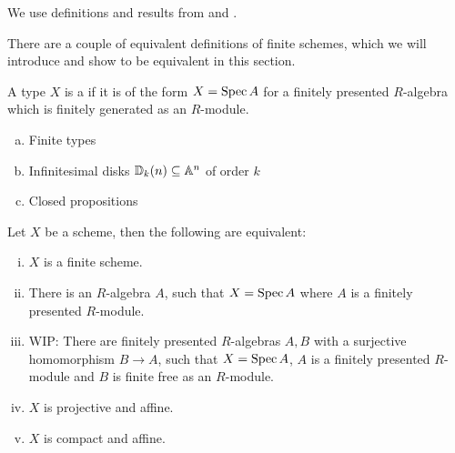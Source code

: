 We use definitions and results from \cite{draft} and \cite{proper-draft}.

There are a couple of equivalent definitions of finite schemes, which we will introduce and show to be equivalent in this section.

\begin{definition}
  A type $X$ is a  if it is of the form $X=\operatorname{Spec} A$ for a finitely presented $R$-algebra which is finitely generated as an $R$-module.
\end{definition}

\begin{example}
  \begin{enumerate}[(a)]
  \item Finite types
  \item Infinitesimal disks $\mathbb{D}_k(n)\subseteq\mathbb{A}^n$ of order $k$
  \item Closed propositions
  \end{enumerate}
\end{example}

\begin{theorem}
  \label{finite-scheme-characterization}
  Let $X$ be a scheme, then the following are equivalent:
  \begin{enumerate}[(i)]
  \item $X$ is a finite scheme.
  \item There is an $R$-algebra $A$, such that $X=\operatorname{Spec} A$ where $A$ is a finitely presented $R$-module.
  \item WIP: There are finitely presented $R$-algebras $A,B$ with a surjective homomorphism $B\to A$, such that $X=\operatorname{Spec} A$, $A$ is a finitely presented $R$-module and $B$ is finite free as an $R$-module.
  \item $X$ is projective and affine.
  \item $X$ is compact and affine.
  \end{enumerate}
\end{theorem}

